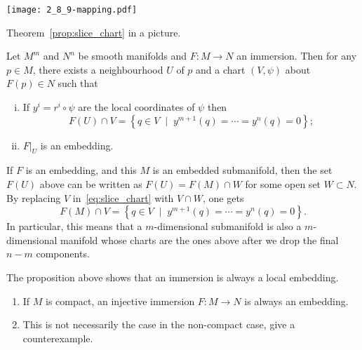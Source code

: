 \begin{marginfigure}
  \texttt{[image: 2\_8\_9-mapping.pdf]}
  \caption{Theorem~\ref{prop:slice_chart} in a picture.}
\end{marginfigure}
\begin{proposition}\label{prop:slice_chart}
  Let $M^m$ and $N^n$ be smooth manifolds and $F:M\to N$ an immersion.
  Then for any $p\in M$, there exists a neighbourhood $U$ of $p$ and a chart $(V,\psi)$ about $F(p)\in N$ such that
  \begin{enumerate}[(i)]
    \item If $y^i = r^i\circ \psi$ are the local coordinates of $\psi$ then
          \begin{equation}\label{eq:slice_chart}
            F(U)\cap V = \left\{ q \in V \;\mid\; y^{m+1}(q)=\cdots=y^n(q)=0\right\};
          \end{equation}
    \item $F\big|_U$ is an embedding.
  \end{enumerate}
\end{proposition}

If $F$ is an embedding, and this $M$ is an embedded submanifold, then the set $F(U)$ above can be written as $F(U) = F(M)\cap W$ for some open set $W\subset N$.
By replacing $V$ in~\eqref{eq:slice_chart} with $V\cap W$, one gets
\begin{equation}
  F(M)\cap V = \left\{ q \in V \;\mid\; y^{m+1}(q)=\cdots=y^n(q)=0\right\}.
\end{equation}
In particular, this means that a $m$-dimensional submanifold is also a $m$-dimensional manifold whose charts are the ones above after we drop the final $n-m$ components.

The proposition above shows that an immersion is always a local embedding.
\begin{exercise}
  \begin{enumerate}
    \item If $M$ is compact, an injective immersion $F:M\to N$ is always an embedding.
    \item This is not necessarily the case in the non-compact case, give a counterexample.
  \end{enumerate}
\end{exercise}

